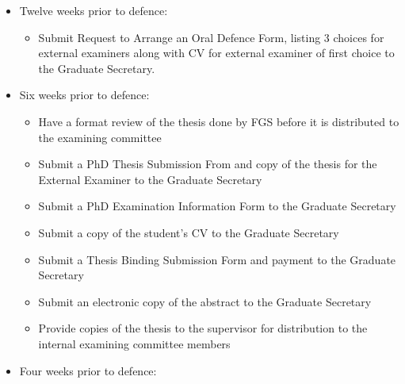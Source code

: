 \documentclass[12pt]{article}
\begin{document}
\begin{itemize}
    \item Twelve weeks prior to defence:

        \begin{itemize}

            \item Submit Request to Arrange an Oral Defence Form, listing 3
                choices for external examiners along with CV for external
                examiner of first choice to the Graduate Secretary.

        \end{itemize}

    \item Six weeks prior to defence:

        \begin{itemize}

            \item Have a format review of the thesis done by FGS before it is
                distributed to the examining committee

            \item Submit a PhD Thesis Submission From and copy of the thesis
                for the External Examiner to the Graduate Secretary

            \item Submit a PhD Examination Information Form to the Graduate
                Secretary

            \item Submit a copy of the student's CV to the Graduate Secretary

            \item Submit a Thesis Binding Submission Form and payment to the
                Graduate Secretary

            \item Submit an electronic copy of the abstract to the Graduate
                Secretary

            \item Provide copies of the thesis to the supervisor for
                distribution to the internal examining committee members

        \end{itemize}

    \item Four weeks prior to defence:

        \begin{itemize}


\end{itemize}
\end{itemize}
\end{document}
